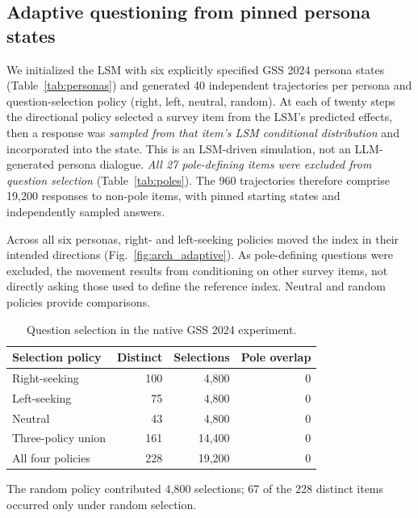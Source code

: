 \documentclass[technote,10pt]{IEEEtran}
\begin{document}
\subsection{Adaptive questioning from pinned persona states}
We initialized the LSM with six explicitly specified GSS 2024 persona states (Table~\ref{tab:personas}) and generated 40 independent trajectories per persona and question-selection policy (right, left, neutral, random). At each of twenty steps the directional policy selected a survey item from the LSM's predicted effects, then a response was \emph{sampled from that item's LSM conditional distribution} and incorporated into the state. This is an LSM-driven simulation, not an LLM-generated persona dialogue. \emph{All 27 pole-defining items were excluded from question selection} (Table~\ref{tab:poles}). The 960 trajectories therefore comprise 19,200 responses to non-pole items, with pinned starting states and independently sampled answers.




Across all six personas, right- and left-seeking policies moved the index in their intended directions (Fig.~\ref{fig:arch_adaptive}). As pole-defining questions were excluded, the movement results from conditioning on other survey items, not directly asking those used to define the reference index. Neutral and random policies provide comparisons.

\begin{table}[!t]
\centering
\caption{Question selection in the native GSS 2024 experiment.}
\label{tab:question-coverage}
\begingroup
\footnotesize
\setlength{\tabcolsep}{4pt}
\renewcommand{\arraystretch}{1.08}
\begin{tabular}{@{}lrrr@{}}
\toprule
\textbf{Selection policy} & \textbf{Distinct} & \textbf{Selections} & \textbf{Pole overlap}\\
\midrule
Right-seeking & 100 & 4,800 & 0\\
Left-seeking & 75 & 4,800 & 0\\
Neutral & 43 & 4,800 & 0\\
\midrule
Three-policy union & 161 & 14,400 & 0\\
All four policies & 228 & 19,200 & 0\\
\bottomrule
\end{tabular}
\endgroup
\par\smallskip
{\footnotesize\raggedright The random policy contributed 4,800 selections; 67 of the 228 distinct items occurred only under random selection.\par}
\end{table}
\end{document}
